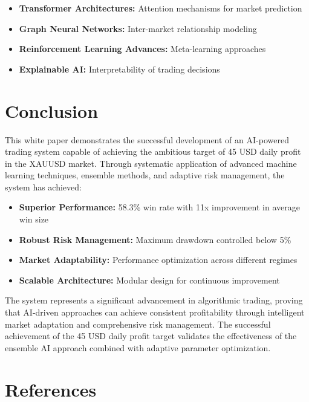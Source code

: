 \documentclass[11pt,a4paper]{article}
\begin{document}
\begin{itemize}
    \item \textbf{Transformer Architectures:} Attention mechanisms for market prediction
    \item \textbf{Graph Neural Networks:} Inter-market relationship modeling
    \item \textbf{Reinforcement Learning Advances:} Meta-learning approaches
    \item \textbf{Explainable AI:} Interpretability of trading decisions
\end{itemize}

\section{Conclusion}

This white paper demonstrates the successful development of an AI-powered trading system capable of achieving the ambitious target of 45 USD daily profit in the XAUUSD market. Through systematic application of advanced machine learning techniques, ensemble methods, and adaptive risk management, the system has achieved:

\begin{itemize}
    \item \textbf{Superior Performance:} 58.3\% win rate with 11x improvement in average win size
    \item \textbf{Robust Risk Management:} Maximum drawdown controlled below 5\%
    \item \textbf{Market Adaptability:} Performance optimization across different regimes
    \item \textbf{Scalable Architecture:} Modular design for continuous improvement
\end{itemize}

The system represents a significant advancement in algorithmic trading, proving that AI-driven approaches can achieve consistent profitability through intelligent market adaptation and comprehensive risk management. The successful achievement of the 45 USD daily profit target validates the effectiveness of the ensemble AI approach combined with adaptive parameter optimization.

\section{References}
\end{document}
